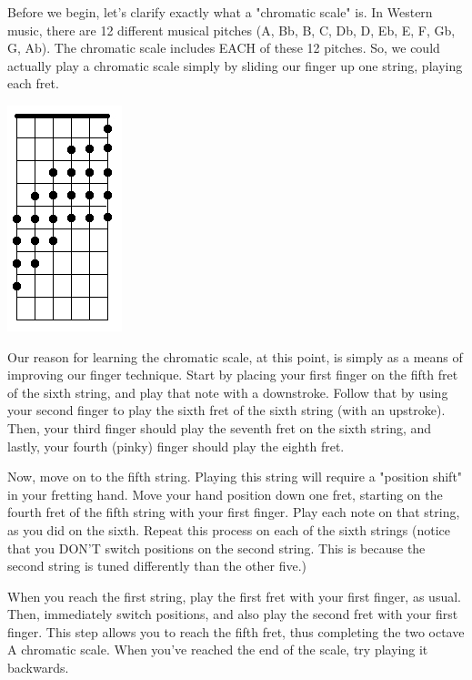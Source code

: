 Before we begin, let's clarify exactly what a "chromatic scale" is. In Western music, there are 12 different musical pitches (A, Bb, B, C, Db, D, Eb, E, F, Gb, G, Ab). The chromatic scale includes EACH of these 12 pitches. So, we could actually play a chromatic scale simply by sliding our finger up one string, playing each fret.

\includegraphics{partsix/chromaticscale2octave.png}

Our reason for learning the chromatic scale, at this point, is simply as a means of improving our finger technique. Start by placing your first finger on the fifth fret of the sixth string, and play that note with a downstroke. Follow that by using your second finger to play the sixth fret of the sixth string (with an upstroke). Then, your third finger should play the seventh fret on the sixth string, and lastly, your fourth (pinky) finger should play the eighth fret.

Now, move on to the fifth string. Playing this string will require a "position shift" in your fretting hand. Move your hand position down one fret, starting on the fourth fret of the fifth string with your first finger. Play each note on that string, as you did on the sixth. Repeat this process on each of the sixth strings (notice that you DON'T switch positions on the second string. This is because the second string is tuned differently than the other five.)

When you reach the first string, play the first fret with your first finger, as usual. Then, immediately switch positions, and also play the second fret with your first finger. This step allows you to reach the fifth fret, thus completing the two octave A chromatic scale. When you've reached the end of the scale, try playing it backwards.

